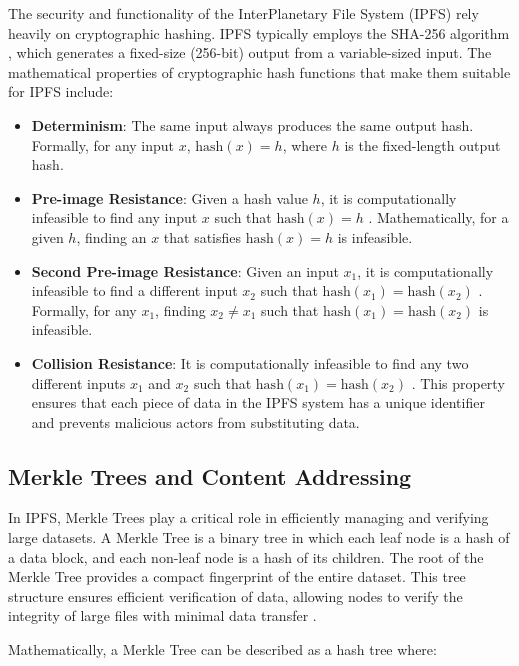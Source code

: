 \documentclass[final]{rc-book-2.14}
\begin{document}
The security and functionality of the InterPlanetary File System (IPFS) rely heavily on cryptographic hashing. IPFS typically employs the SHA-256 algorithm \cite{menezes1996handbook}, which generates a fixed-size (256-bit) output from a variable-sized input. The mathematical properties of cryptographic hash functions that make them suitable for IPFS include:

\begin{itemize}
    \item \textbf{Determinism}: The same input always produces the same output hash. Formally, for any input $x$, $\text{hash}(x) = h$, where $h$ is the fixed-length output hash.
    \item \textbf{Pre-image Resistance}: Given a hash value $h$, it is computationally infeasible to find any input $x$ such that $\text{hash}(x) = h$ \cite{nakamoto2008bitcoin}. Mathematically, for a given $h$, finding an $x$ that satisfies $\text{hash}(x) = h$ is infeasible.
    \item \textbf{Second Pre-image Resistance}: Given an input $x_1$, it is computationally infeasible to find a different input $x_2$ such that $\text{hash}(x_1) = \text{hash}(x_2)$ \cite{menezes1996handbook}. Formally, for any $x_1$, finding $x_2 \neq x_1$ such that $\text{hash}(x_1) = \text{hash}(x_2)$ is infeasible.
    \item \textbf{Collision Resistance}: It is computationally infeasible to find any two different inputs $x_1$ and $x_2$ such that $\text{hash}(x_1) = \text{hash}(x_2)$ \cite{nist2012fips}. This property ensures that each piece of data in the IPFS system has a unique identifier and prevents malicious actors from substituting data.
\end{itemize}

\subsection{Merkle Trees and Content Addressing}

In IPFS, Merkle Trees play a critical role in efficiently managing and verifying large datasets. A Merkle Tree is a binary tree in which each leaf node is a hash of a data block, and each non-leaf node is a hash of its children. The root of the Merkle Tree provides a compact fingerprint of the entire dataset. This tree structure ensures efficient verification of data, allowing nodes to verify the integrity of large files with minimal data transfer \cite{merkle1989hash}.

Mathematically, a Merkle Tree can be described as a hash tree where:
\end{document}
